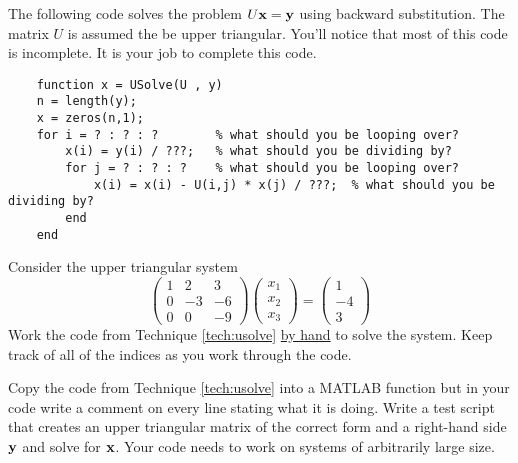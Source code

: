 \begin{technique}\label{tech:usolve}
    The following code solves the problem $U {\bf x} = {\bf y}$ using backward
    substitution.  The matrix $U$ is assumed the be upper triangular.  You'll notice that
    most of this code is incomplete.  It is your job to complete this code.
    \begin{verbatim}
    function x = USolve(U , y)
    n = length(y);
    x = zeros(n,1);
    for i = ? : ? : ?        % what should you be looping over?
        x(i) = y(i) / ???;   % what should you be dividing by?
        for j = ? : ? : ?    % what should you be looping over? 
            x(i) = x(i) - U(i,j) * x(j) / ???;  % what should you be dividing by?
        end
    end
    \end{verbatim}
\end{technique}

\begin{problem}
    Consider the upper triangular system
    \[ \begin{pmatrix} 1 & 2 & 3 \\ 0 & -3 & -6 \\ 0 & 0 & -9 \end{pmatrix}
        \begin{pmatrix} x_1 \\ x_2 \\ x_3 \end{pmatrix} = \begin{pmatrix} 1 \\ -4 \\
        3\end{pmatrix} \]
    Work the code from Technique \ref{tech:usolve} \underline{by hand} to solve the
    system.  Keep track of all of the indices as you work through the code.
\end{problem}

\begin{problem}
    Copy the code from Technique \ref{tech:usolve} into a MATLAB function but in your code
    write a comment on every line stating what it is doing.  Write a test script that
    creates an upper triangular matrix of the correct form and a right-hand side ${\bf y}$ and
    solve for ${\bf x}$.  Your code needs to work on systems of arbitrarily large size.
\end{problem}

